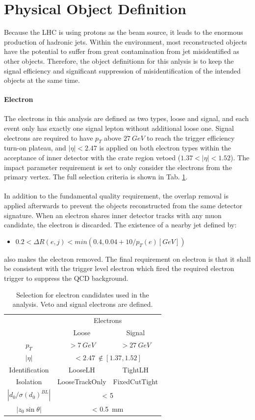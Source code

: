 \section{Physical Object Definition}
Because the LHC is using protons as the beam source, it leads to the enormous production of hadronic jets. Within the environment, most reconstructed objects have the potential to suffer from great contamination from jet misidentified as other objects. Therefore, the object definitionn for this anlysis is to keep the signal efficiency and significant suppression of misidentification of the intended objects at the same time. 
\\
\\{\bf Electron}
\\
\\The electrons in this analysis are defined as two types, loose and signal, and each event only has exactly one signal lepton without additional loose one. Signal electrons are required to have $p_{T}$ above $27~GeV$ to reach the trigger efficiency turn-on plateau, and $|\eta|<2.47$ is applied on both electron types within the acceptance of inner detector with the crate region vetoed ($1.37<|\eta|<1.52$). The impact parameter requirement is set to only consider the electrons from the primary vertex. The full selection criteria is shown in Tab. \ref{Tab:eledefin}. 
\\
\\In addition to the fundamental quality requirement, the overlap removal is applied afterwards to prevent the objects reconstructed from the same detector signature. When an electron shares inner detector tracks with any muon candidate, the electron is discarded. The existence of a nearby jet defined by:
\begin{itemize}
	\item $0.2<\Delta R(e,j)<min(0.4,0.04+10/p_{T}(e)[GeV])$
\end{itemize}
also makes the electron removed. The final requirement on electron is that it shall be consistent with the trigger level electron which fired the required electron trigger to suppress the QCD background. 
\begin{table}[htb]
	\caption{Selection for electron candidates used in the analysis. Veto and signal electrons are defined.}\label{Tab:eledefin}
	\centering
	\begin{tabular}{|c||c|c|}
		\hline
		& \multicolumn{2}{c|}{ Electrons}\\
		&   Loose & Signal \\
		\hline
		$p_T$ & $>7~GeV$ & $>27~GeV$  \\
		\hline
		$| \eta |$ &  \multicolumn{2}{c|}{ $< 2.47 ~ \notin [1.37,1.52]$ } \\
		\hline
		Identification & LooseLH & TightLH   \\
		\hline
		Isolation       &   LooseTrackOnly & FixedCutTight  \\
		\hline
		$|d_0/\sigma(d_0)^{BL}|$ &   \multicolumn{2}{|c|}{  < 5}  \\
		\hline
		$|z_0\sin\theta| $  & \multicolumn{2}{|c|}{< 0.5~mm}  \\
		\hline
	\end{tabular}
\end{table}
